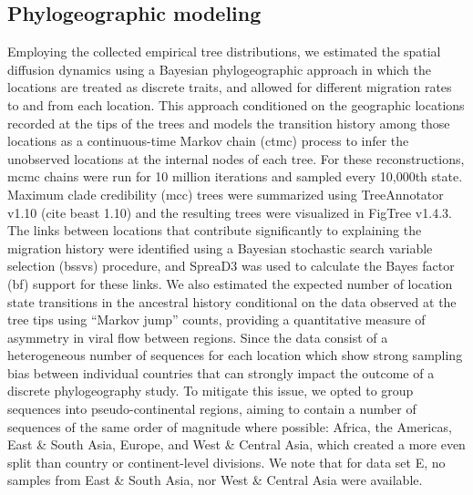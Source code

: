 \subsection{Phylogeographic modeling}

Employing the collected empirical tree distributions, we estimated the spatial diffusion dynamics using a Bayesian phylogeographic approach in which the locations are treated as discrete traits, and allowed for different migration rates to and from each location.
This approach conditioned on the geographic locations recorded at the tips of the trees and models the transition history among those locations as a continuous-time Markov chain (\gls{ctmc}) process to infer the unobserved locations at the internal nodes of each tree.
For these reconstructions, \gls{mcmc} chains were run for 10 million iterations and sampled every 10,000th state.
Maximum clade credibility (\gls{mcc}) trees were summarized using TreeAnnotator v1.10 (cite \gls{beast} 1.10) and the resulting trees were visualized in FigTree v1.4.3.
The links between locations that contribute significantly to explaining the migration history were identified using a Bayesian stochastic search variable selection (\gls{bssvs}) procedure, and SpreaD3\cite{bielejec2016spread3} was used to calculate the Bayes factor (\gls{bf}) support for these links.
We also estimated the expected number of location state transitions in the ancestral history conditional on the data observed at the tree tips using ``Markov jump'' counts, providing a quantitative measure of asymmetry in viral flow between regions.
Since the data consist of a heterogeneous number of sequences for each location which show strong sampling bias between individual countries that can strongly impact the outcome of a discrete phylogeography study.
To mitigate this issue, we opted to group sequences into pseudo-continental regions, aiming to contain a number of sequences of the same order of magnitude where possible: Africa, the Americas, East \& South Asia, Europe, and West \& Central Asia, which created a more even split than country or continent-level divisions.
We note that for data set E, no samples from East \& South Asia, nor West \& Central Asia were available.

